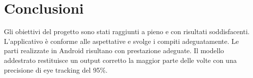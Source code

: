 \documentclass[11pt]{article}
\begin{document}
\newpage
\section{Conclusioni}
Gli obiettivi del progetto sono stati raggiunti a pieno e con risultati soddisfacenti. 
\newline \newline
L’applicativo è
conforme alle aspettative e svolge i compiti adeguatamente.
Le parti realizzate
in Android risultano con prestazione adeguate.
\newline \newline
Il modello addestrato restituisce un output corretto la maggior parte delle volte con una precisione di eye tracking del 95\%.
\end{document}
